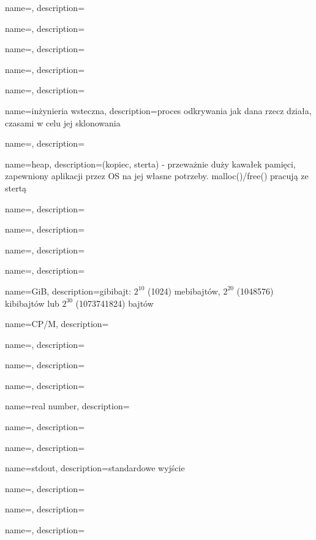 {
  name={\PLph},
  description={\PLph}
}

{
  name={\PLph},
  description={\PLph}
}

{
  name={\PLph},
  description={\PLph}
}

{
  name={\PLph},
  description={\PLph}
}

{
  name={\PLph},
  description={\PLph}
}

{
  name={inżynieria wsteczna},
  description={proces odkrywania jak dana rzecz działa, czasami w celu jej sklonowania}
}

{
  name={\PLph},
  description={\PLph}
}

{
  name={heap},
  description={(kopiec, sterta) - przeważnie duży kawałek pamięci, zapewniony aplikacji przez \ac{OS} na jej własne potrzeby. malloc()/free() pracują ze stertą}
}

{
  name={\PLph},
  description={\PLph}
}

{
  name={\PLph},
  description={\PLph}
}

{
  name={\PLph},
  description={\PLph}
}

{
  name={\PLph},
  description={\PLph}
}

{
  name=GiB,
  description={gibibajt: $2^{10}$ (1024) mebibajtów, $2^{20}$ (1048576) kibibajtów lub $2^{30}$ (1073741824) bajtów}
}

{
  name=CP/M,
  description={\PLph}
}

{
  name={\PLph},
  description={\PLph}
}

{
  name={\PLph},
  description={\PLph}
}

{
  name={\PLph},
  description={\PLph}
}

{
  name={real number},
  description={\PLph}
}

{
  name={\PLph},
  description={\PLph}
}

{
  name={\PLph},
  description={\PLph}
}

{
  name={stdout},
  description={standardowe wyjście}
}

{
  name={\PLph},
  description={\PLph}
}

{
  name={\PLph},
  description={\PLph}
}

{
  name={\PLph},
  description={\PLph}
}

